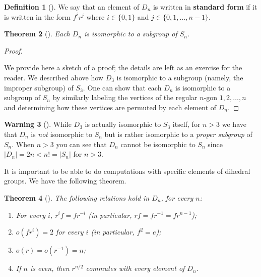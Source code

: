 \documentclass[10pt,]{book}
\newcommand{\terminology}[1]{\textbf{#1}}
\theoremstyle{plain}
\newtheorem{theorem}{Theorem}[section]
\theoremstyle{definition}
\newtheorem{definition}[theorem]{Definition}
\theoremstyle{definition}
\newtheorem{warning}[theorem]{Warning}
\theoremstyle{definition}
\theoremstyle{definition}
\numberwithin{equation}{section}
\newcommand{\lt}{<}
\begin{document}
\begin{definition}[{}]\label{definition-54}
We say that an element of \(D_n\) is written in \terminology{standard form} if it is written in the form \(f^ir^j\) where \(i\in \{0,1\}\) and \(j\in \{0,1,\ldots,n-1\}\).%
\end{definition}
\begin{theorem}[{}]\label{theorem-41}
Each \(D_n\) is isomorphic to a subgroup of \(S_n\).%
\end{theorem}
\begin{proof}\hypertarget{proof-33}{}
We provide here a sketch of a proof; the details are left as an exercise for the reader. We described above how \(D_3\) is isomorphic to a subgroup (namely, the improper subgroup) of \(S_3\). One can show that each \(D_n\) is isomorphic to a subgroup of \(S_n\) by similarly labeling the vertices of the regular \(n\)-gon \(1,2,\ldots, n\) and determining how these vertices are permuted by each element of \(D_n\).%
\end{proof}
\begin{warning}[]\label{warning-19}
While \(D_3\) is actually isomorphic to \(S_3\) itself, for \(n>3\) we have that \(D_n\) is \emph{not} isomorphic to \(S_n\) but is rather isomorphic to a \emph{proper subgroup} of \(S_n\). When \(n>3\) you can see that \(D_n\) cannot be isomorphic to \(S_n\) since \(|D_n|=2n \lt  n! = |S_n|\) for \(n>3\).%
\end{warning}
It is important to be able to do computations with specific elements of dihedral groups. We have the following theorem.%
\begin{theorem}[{}]\label{diords}
The following relations hold in \(D_n\), for every \(n\): \leavevmode%
\begin{enumerate}
\item\hypertarget{li-352}{}For every \(i\), \(r^if=fr^{-i}\) (in particular, \(rf=fr^{-1}=fr^{n-1}\));%
\item\hypertarget{li-353}{}\(o(fr^i)=2\) for every \(i\) (in particular, \(f^2=e\));%
\item\hypertarget{li-354}{}\(o(r)=o(r^{-1})=n\);%
\item\hypertarget{li-355}{}If \(n\) is even, then \(r^{n/2}\) commutes with every element of \(D_n\).%
\end{enumerate}
%
\end{theorem}
\end{document}
